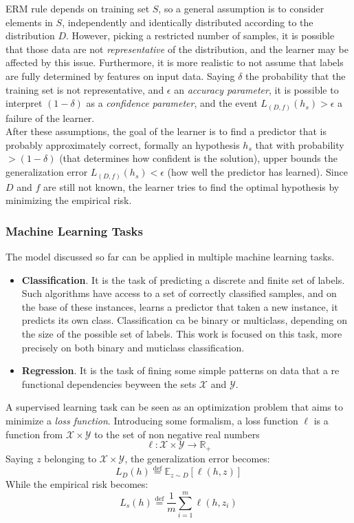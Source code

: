 \ac{ERM} rule depends on training set $S$, so a general assumption is to consider elements in $S$, independently and identically distributed according to the distribution $D$. However, picking a restricted number of samples, it is possible that those data are not \textit{representative} of the distribution, and the learner may be affected by this issue. Furthermore, it is more realistic to not assume that labels are fully determined by features on input data. Saying $\delta$ the probability that the training set is not representative, and $\epsilon$ an \textit{accuracy parameter}, it is possible to interpret $(1-\delta)$ as a \textit{confidence parameter}, and the event $L_{(D,f)}(h_s) > \epsilon$ a failure of the learner.\\
After these assumptions, the goal of the learner is to find a predictor that is probably approximately correct, formally an hypothesis $h_s$ that with probability $> (1-\delta)$ (that determines how confident is the solution), upper bounds the generalization error $L_{(D,f)}(h_s) < \epsilon$ (how well the predictor has learned). Since $D$ and $f$ are still not known, the learner tries to find the optimal hypothesis by minimizing the empirical risk.\\

\subsubsection{Machine Learning Tasks}
The model discussed so far can be applied in multiple machine learning tasks.
\begin{itemize}
	\item \textbf{Classification}. It is the task of predicting a discrete and finite set of labels. Such algorithms have access to a set of correctly classified samples, and on the base of these instances, learns a predictor that taken a new instance, it predicts its own class. Classification ca be binary or multiclass, depending on the size of the possible set of labels. This work is focused on this task, more precisely on both binary and muticlass classification.
	\item \textbf{Regression}. It is the task of fining some simple patterns on data that a re functional dependencies beyween the sets $\mathcal{X}$ and $\mathcal{Y}$.
\end{itemize}

A supervised learning task can be seen as an optimization problem that aims to minimize a \textit{loss function}. Introducing some formalism, a loss function $\ell$ is a function from $\mathcal{X} \times \mathcal{Y}$ to the set of non negative real numbers
\[\ell: \mathcal{X} \times \mathcal{Y} \rightarrow \mathbb{R}_+\]
Saying $z$ belonging to $\mathcal{X} \times \mathcal{Y}$, the generalization error becomes:
\[L_D(h) \stackrel{\text{def}}{=} \mathbb{E}_{z \sim D}[\ell (h,z)]\]
While the empirical risk becomes:
\[L_s(h)\stackrel{\text{def}}{=} \frac{1}{m} \sum_{i=1}^{m} \ell (h, z_i)\]

